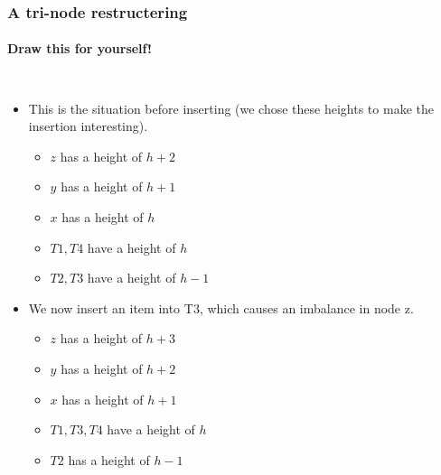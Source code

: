 \begin{frame}
	\frametitle{A tri-node restructering}
	\framesubtitle{Draw this for yourself!}
	\vspace{-15pt}
	\begin{columns}[T]
		\begin{itemize}
			\item This is the situation before inserting (we chose these heights to make the insertion interesting).
				
				\begin{itemize}
					\item $z$ has a height of $h+2$
					\item $y$ has a height of $h+1$
					\item $x$ has a height of $h$
					\item $T1,T4$ have a height of $h$
					\item $T2,T3$ have a height of $h-1$
				\end{itemize}
				
			\item We now insert an item into T3, which causes an imbalance in node z.
				
				\begin{itemize}
					\item $z$ has a height of $h+3$
					\item $y$ has a height of $h+2$
					\item $x$ has a height of $h+1$
					\item $T1,T3,T4$ have a height of $h$
					\item $T2$ has a height of $h-1$
				\end{itemize}
		\end{itemize}
			
	\end{columns}
\end{frame}

